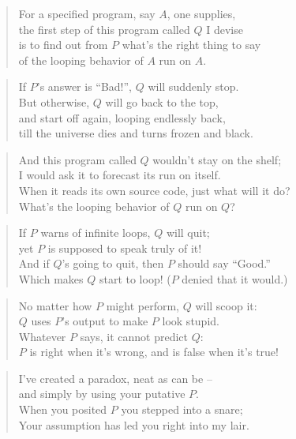 \documentclass{article}
\begin{document}
\begin{verse}
For a specified program, say \(A\), one supplies,\\
the first step of this program called \(Q\) I devise\\
is to find out from \(P\) what's the right thing to say\\
of the looping behavior of \(A\) run on \(A\).
\end{verse}
\begin{verse}
If \(P\)'s answer is ``Bad!'', \(Q\) will suddenly stop.\\
But otherwise, \(Q\) will go back to the top,\\
and start off again, looping endlessly back,\\
till the universe dies and turns frozen and black.
\end{verse}
\begin{verse}
And this program called \(Q\) wouldn't stay on the shelf;\\
I would ask it to forecast its run on itself.\\
When it reads its own source code, just what will it do?\\
What's the looping behavior of \(Q\) run on \(Q\)?
\end{verse}
\begin{verse}
If \(P\) warns of infinite loops, \(Q\) will quit;\\
yet \(P\) is supposed to speak truly of it!\\
And if \(Q\)'s going to quit, then \(P\) should say ``Good.''\\
Which makes \(Q\) start to loop! (\(P\) denied that it would.)
\end{verse}
\begin{verse}
No matter how \(P\) might perform, \(Q\) will scoop it:\\
\(Q\) uses \(P\)'s output to make \(P\) look stupid.\\
	Whatever \(P\) says, it cannot predict \(Q\):\\
\(P\) is right when it's wrong, and is false when it's true!
\end{verse}
\begin{verse}
I’ve created a paradox, neat as can be --\\
and simply by using your putative \(P\).\\
When you posited \(P\) you stepped into a snare;\\
Your assumption has led you right into my lair.
\end{verse}
\end{document}
